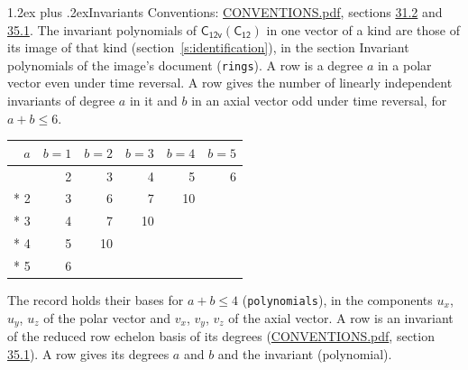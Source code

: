 \documentclass[10pt,a4paper]{article}
\makeatletter
\renewcommand\section{\@startsection{section}{1}{\z@}{-3ex plus -1ex minus -.2ex}%
  {1.2ex plus .2ex}{\normalfont\large\sffamily\bfseries\color{parttitle}}}
\numberwithin{equation}{section}
\newcommand{\grp}[1]{\mathsf{#1}}
\makeatother
\begin{document}
\section{Invariants}\label{s:invariants}
Conventions: \href{../../CONVENTIONS.pdf}{CONVENTIONS.pdf}, sections \href{../../CONVENTIONS.pdf\#conv.31.2}{31.2} and \href{../../CONVENTIONS.pdf\#conv.35.1}{35.1}.
The invariant polynomials of $\grp{C_{12v}}(\grp{C_{12}})$ in one vector of a kind are those of its image of that kind (section~\ref{s:identification}), in the section Invariant polynomials of the image's document (\texttt{rings}).
\leavevmode\label{n:index.degree.polar}\label{n:index.degree.axial}A row is a degree $a$ in a polar vector even under time reversal. A row gives the number of linearly independent invariants of degree $a$ in it and $b$ in an axial vector odd under time reversal, for $a + b \le 6$.
{\small\begin{longtable}{@{}rrrrrr@{}}\toprule
$a$ & $b = 1$ & $b = 2$ & $b = 3$ & $b = 4$ & $b = 5$\\\midrule\endhead
\bottomrule\endfoot\endlastfoot
1 & 2 & 3 & 4 & 5 & 6\\*
2 & 3 & 6 & 7 & 10 & \\*
3 & 4 & 7 & 10 &  & \\*
4 & 5 & 10 &  &  & \\*
5 & 6 &  &  &  & \\
\bottomrule\end{longtable}}
\leavevmode\label{n:local.component.polar}\label{n:local.component.axial}The record holds their bases for $a + b \le 4$ (\texttt{polynomials}), in the components $u_{x}$, $u_{y}$, $u_{z}$ of the polar vector and $v_{x}$, $v_{y}$, $v_{z}$ of the axial vector. \label{n:head.polynomial}A row is an invariant of the reduced row echelon basis of its degrees (\href{../../CONVENTIONS.pdf}{CONVENTIONS.pdf}, section \href{../../CONVENTIONS.pdf\#conv.35.1}{35.1}). A row gives its degrees $a$ and $b$ and the invariant (polynomial).
\end{document}
